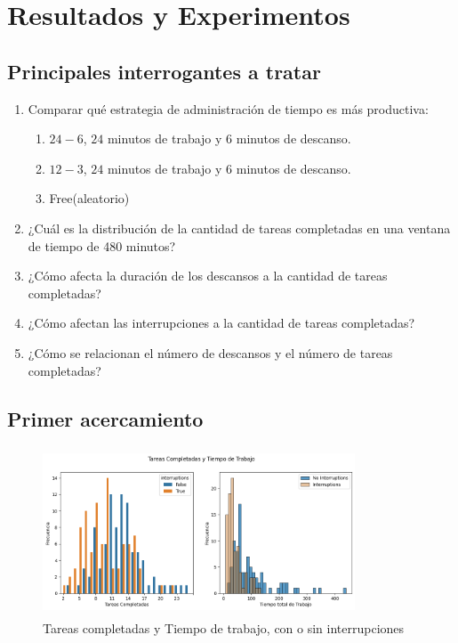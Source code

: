 \documentclass[10pt,a4paper,twocolumn]{article}
\begin{document}
\section{Resultados y Experimentos} 

\subsection{Principales interrogantes a tratar}
\begin{enumerate}
    \item Comparar qu\'e estrategia de administración de tiempo es m\'as productiva:
    \begin{enumerate}
        \item $24-6$, $24$ minutos de trabajo y $6$ minutos de descanso.
        \item $12-3$, $24$ minutos de trabajo y $6$ minutos de descanso.
        \item Free(aleatorio)
    \end{enumerate}
    
    \item ¿Cuál es la distribución de la cantidad de tareas completadas en una ventana de tiempo de 480 minutos?
    \item ¿Cómo afecta la duración de los descansos a la cantidad de tareas completadas?
    \item ¿Cómo afectan las interrupciones a la cantidad de tareas completadas?
    \item ¿Cómo se relacionan el número de descansos y el número de tareas completadas? 
\end{enumerate}

\subsection{Primer acercamiento}


\begin{figure}[H] %
    \includegraphics[width=9.3cm, height=5cm, left]{tareas_completada_y_tiempo_de_trabajo.png} %
    \caption{Tareas completadas y Tiempo de trabajo, con o sin interrupciones} %
    \label{fig:mi_imagen5} %
\end{figure}
\end{document}
